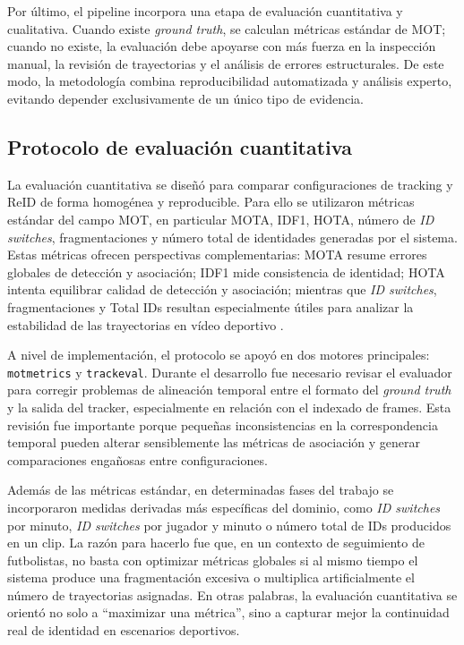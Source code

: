 \documentclass[../MAIN.tex]{subfiles}
\begin{document}
	Por último, el pipeline incorpora una etapa de evaluación cuantitativa y cualitativa. Cuando existe \textit{ground truth}, se calculan métricas estándar de MOT; cuando no existe, la evaluación debe apoyarse con más fuerza en la inspección manual, la revisión de trayectorias y el análisis de errores estructurales. De este modo, la metodología combina reproducibilidad automatizada y análisis experto, evitando depender exclusivamente de un único tipo de evidencia.
	
	\subsection{Protocolo de evaluación cuantitativa}
	
	La evaluación cuantitativa se diseñó para comparar configuraciones de tracking y ReID de forma homogénea y reproducible. Para ello se utilizaron métricas estándar del campo MOT, en particular MOTA, IDF1, HOTA, número de \textit{ID switches}, fragmentaciones y número total de identidades generadas por el sistema. Estas métricas ofrecen perspectivas complementarias: MOTA resume errores globales de detección y asociación; IDF1 mide consistencia de identidad; HOTA intenta equilibrar calidad de detección y asociación; mientras que \textit{ID switches}, fragmentaciones y Total IDs resultan especialmente útiles para analizar la estabilidad de las trayectorias en vídeo deportivo \parencite{ciaparrone2020survey,zhang2022bytetrack,cioppa2022soccernettracking}.
	
	A nivel de implementación, el protocolo se apoyó en dos motores principales: \texttt{motmetrics} y \texttt{trackeval}. Durante el desarrollo fue necesario revisar el evaluador para corregir problemas de alineación temporal entre el formato del \textit{ground truth} y la salida del tracker, especialmente en relación con el indexado de frames. Esta revisión fue importante porque pequeñas inconsistencias en la correspondencia temporal pueden alterar sensiblemente las métricas de asociación y generar comparaciones engañosas entre configuraciones.
	
	Además de las métricas estándar, en determinadas fases del trabajo se incorporaron medidas derivadas más específicas del dominio, como \textit{ID switches} por minuto, \textit{ID switches} por jugador y minuto o número total de IDs producidos en un clip. La razón para hacerlo fue que, en un contexto de seguimiento de futbolistas, no basta con optimizar métricas globales si al mismo tiempo el sistema produce una fragmentación excesiva o multiplica artificialmente el número de trayectorias asignadas. En otras palabras, la evaluación cuantitativa se orientó no solo a “maximizar una métrica”, sino a capturar mejor la continuidad real de identidad en escenarios deportivos.
	
\end{document}
